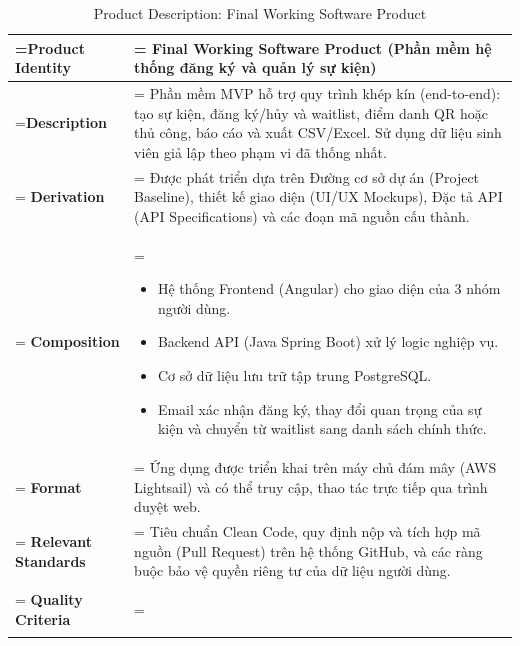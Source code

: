 \documentclass{article}
\begin{document}
\clearpage
\begin{table}[H]
    \centering
    \caption{Product Description: Final Working Software Product}
    \renewcommand{\arraystretch}{1.5}
    \begin{tabularx}{\textwidth}{|>{\hsize=0.5\hsize\linewidth=\hsize\bfseries}X|>{\hsize=1.5\hsize\linewidth=\hsize}X|}
        \hline
        Product Identity & \textbf{Final Working Software Product} (Phần mềm hệ thống đăng ký và quản lý sự kiện) \\
        \hline
        Description & Phần mềm MVP hỗ trợ quy trình khép kín (end-to-end): tạo sự kiện, đăng ký/hủy và waitlist, điểm danh QR hoặc thủ công, báo cáo và xuất CSV/Excel. Sử dụng dữ liệu sinh viên giả lập theo phạm vi đã thống nhất. \\
        \hline
        Derivation & Được phát triển dựa trên Đường cơ sở dự án (Project Baseline), thiết kế giao diện (UI/UX Mockups), Đặc tả API (API Specifications) và các đoạn mã nguồn cấu thành. \\
        \hline
        Composition & 
        \vspace{-0.8em}
        \begin{itemize}[leftmargin=*, nosep]
            \item Hệ thống Frontend (Angular) cho giao diện của 3 nhóm người dùng.
            \item Backend API (Java Spring Boot) xử lý logic nghiệp vụ.
            \item Cơ sở dữ liệu lưu trữ tập trung PostgreSQL.
            \item Email xác nhận đăng ký, thay đổi quan trọng của sự kiện và chuyển từ waitlist sang danh sách chính thức.
        \end{itemize}
        \vspace{-1em} \\
        \hline
        Format & Ứng dụng được triển khai trên máy chủ đám mây (AWS Lightsail) và có thể truy cập, thao tác trực tiếp qua trình duyệt web. \\
        \hline
        Relevant Standards & Tiêu chuẩn Clean Code, quy định nộp và tích hợp mã nguồn (Pull Request) trên hệ thống GitHub, và các ràng buộc bảo vệ quyền riêng tư của dữ liệu người dùng. \\
        \hline
        Quality Criteria & 
        \vspace{-0.8em}
        \begin{itemize}[leftmargin=*, nosep]

\end{itemize}
\end{tabularx}
\end{table}
\end{document}
